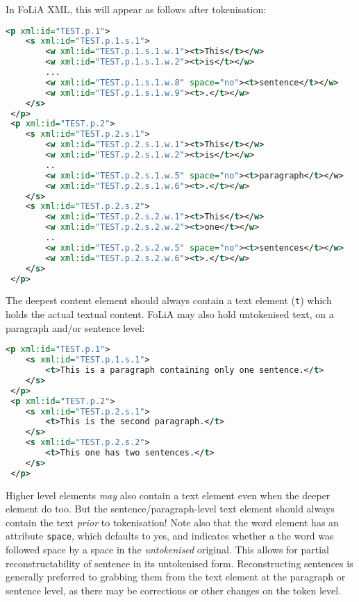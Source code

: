 \documentclass[a4paper,12pt]{report}
\begin{document}
In FoLiA XML, this will appear as follows after tokenisation:


\begin{lstlisting}[language=xml]
 <p xml:id="TEST.p.1">
    <s xml:id="TEST.p.1.s.1">        
        <w xml:id="TEST.p.1.s.1.w.1"><t>This</t></w>
        <w xml:id="TEST.p.1.s.1.w.2"><t>is</t></w>
        ...
        <w xml:id="TEST.p.1.s.1.w.8" space="no"><t>sentence</t></w>
        <w xml:id="TEST.p.1.s.1.w.9"><t>.</t></w>
    </s>
 </p>
 <p xml:id="TEST.p.2">
    <s xml:id="TEST.p.2.s.1">
        <w xml:id="TEST.p.2.s.1.w.1"><t>This</t></w>
        <w xml:id="TEST.p.2.s.1.w.2"><t>is</t></w>    
        ..
        <w xml:id="TEST.p.2.s.1.w.5" space="no"><t>paragraph</t></w>    
        <w xml:id="TEST.p.2.s.1.w.6"><t>.</t></w>    
    </s>
    <s xml:id="TEST.p.2.s.2">
        <w xml:id="TEST.p.2.s.2.w.1"><t>This</t></w>
        <w xml:id="TEST.p.2.s.2.w.2"><t>one</t></w>    
        ..
        <w xml:id="TEST.p.2.s.2.w.5" space="no"><t>sentences</t></w>    
        <w xml:id="TEST.p.2.s.2.w.6"><t>.</t></w>    
    </s>
 </p>
\end{lstlisting}


The deepest content element should always contain a text element (\texttt{t}) which holds the actual textual content. FoLiA may also hold untokenised text, on a paragraph and/or sentence level:

\begin{lstlisting}[language=xml]
 <p xml:id="TEST.p.1">
    <s xml:id="TEST.p.1.s.1">        
        <t>This is a paragraph containing only one sentence.</t>
    </s>
 </p>
 <p xml:id="TEST.p.2">
    <s xml:id="TEST.p.2.s.1">     
        <t>This is the second paragraph.</t>
    </s>
    <s xml:id="TEST.p.2.s.2">     
        <t>This one has two sentences.</t>
    </s>    
 </p>
\end{lstlisting}

Higher level elements \emph{may} also contain a text element even when the deeper element do too. But the sentence/paragraph-level text element should always contain the text \emph{prior} to tokenisation! Note also that the word element has an attribute \texttt{space}, which defaults to yes, and indicates whether a the word was followed space by a space in the \emph{untokenised} original. This allows for partial reconstructability of sentence in its  untokenised form. Reconstructing sentences is generally preferred to grabbing them from the text element at the paragraph or sentence level, as there may be corrections or other changes on the token level. 
\end{document}
